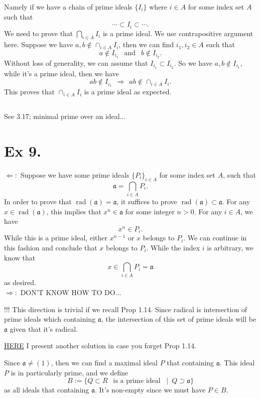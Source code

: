 Namely if we have a chain of prime ideals $\{I_i\}$ where $i\in A$ for some index set $A$ such that 
$$\cdots\subset I_i\subset \cdots.$$ We need to prove that $\bigcap _{i\in A} I_i$ is a prime ideal. 
We use contrapositive argument here. Suppose we have $a,b\notin \cap _{i\in A}I_i$, then we can find $i_1,i_2\in A$ such that 
$$a\notin I_{i_1}~~\text{ and }~~ b\notin I_{i_2}.$$
Without loss of generality, we can assume that $I_{i_1}\subset I_{i_2}$. So we have $a,b\notin I_{i_1}$, while it's a prime ideal, then we have 
$$ab\notin I_{i_1} ~~ \Rightarrow ~~ ab\notin \cap _{i\in A}I_i.$$
This proves that $\cap _{i\in A} I_i$ is a prime ideal as expected.

\subsection{}

See \cite{altman} 3.17; minimal prime over an ideal...

\section{Ex 9.}

$\Leftarrow:$ Suppose we have some prime ideals $\{P_i\}_{i\in A}$ for some index set $A$, such that 
$$\mathfrak a=\bigcap _{i\in A} P_i.$$
In order to prove that $\operatorname{rad}(\mathfrak a)=\mathfrak a$, it suffices to prove $\operatorname{rad}(\mathfrak a)\subset \mathfrak a$.
For any $x\in \operatorname{rad}(\mathfrak a)$, this implies that $x^n\in\mathfrak a$ for some integer $n>0$. For any $i\in A$, we have 
$$x^n\in P_i.$$
While this is a prime ideal, either $x^{n-1}$ or $x$ belongs to $P_i$. We can continue in this fashion and conclude that $x$ belongs to $P_i$. While the index $i$ is arbitrary, we know that $$x\in \bigcap _{i\in A}P_i=\mathfrak a$$ as desired.\\

\noindent$\Rightarrow:$ DON'T KNOW HOW TO DO... 

!!! This direction is trivial if we recall Prop 1.14. Since radical is intersection of prime ideals which containing $\mathfrak a$, the intersection of this set of prime ideals will be $\mathfrak a$ given that it's radical.


\href{https://math.stackexchange.com/questions/49309/intersection-of-prime-ideals}{HERE} I present another solution in case you forget Prop 1.14.

Since $\mathfrak a\neq (1)$, then we can find a maximal ideal $P$ that containing $\mathfrak a$. This ideal $P$ is in particularly prime, and we define 
$$B:=\{Q\subset R ~~\text{ is a prime ideal }~\mid~ Q\supset \mathfrak a\}$$
as all ideals that containing $\mathfrak a$. It's non-empty since we must have $P\in B$. 

